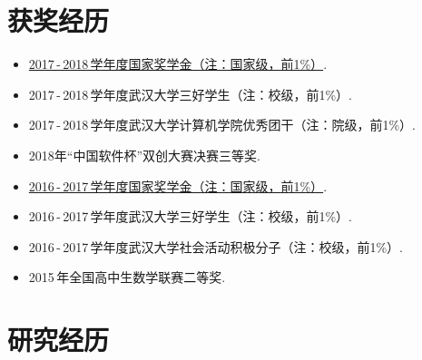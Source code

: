 \documentclass[letterpaper,AutoFakeBold]{twentysecondcv} %
\begin{document}



\section{\large 获奖经历}


\begin{itemize}
	\setlength{\itemsep}{0pt}
	\setlength{\parsep}{0pt}
	\setlength{\parskip}{0pt}
	\item
	\href{https://raw.githubusercontent.com/HwwAncient/CV/master/Materials/17-18NationalScholarship.jpg} 
	{2017\,-\,2018\,学年度国家奖学金（注：国家级，前1\%）}.
	\item 2017\,-\,2018\,学年度武汉大学三好学生（注：校级，前1\%）.
	\item 2017\,-\,2018\,学年度武汉大学计算机学院优秀团干（注：院级，前1\%）.
	\item 2018年“中国软件杯”双创大赛决赛三等奖.
	\item \href{https://raw.githubusercontent.com/HwwAncient/CV/master/Materials/16-17NationalScholarship.jpg}
	{2016\,-\,2017\,学年度国家奖学金（注：国家级，前1\%）}.
	\item 2016\,-\,2017\,学年度武汉大学三好学生（注：校级，前1\%）.
	\item 2016\,-\,2017\,学年度武汉大学社会活动积极分子（注：校级，前1\%）.
	\item 2015\,年全国高中生数学联赛二等奖.
\end{itemize}



\section{\large 研究经历}
\end{document}
